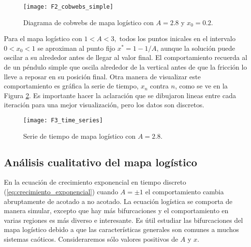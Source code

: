             \begin{figure}[hbtp]
                \caption{Diagrama de cobwebs de mapa logístico con $A = 2.8$ y $x_{0} = 0.2$.}
                \centering
                \texttt{[image: F2\_cobwebs\_simple]}
                \label{fig:F2_cobwebs_simple}
            \end{figure}

            Para el mapa logístico con $1 < A < 3,$ todos los puntos inicales en el intervalo $0 < x_{0} < 1$ se aproximan al punto fijo $x^{*} = 1 - 1/ A $, aunque la solución puede oscilar a su alrededor antes de llegar al valor final. El comportamiento recuerda al de un péndulo simple que oscila alrededor de la vertical antes de que la fricción lo lleve a reposar en su posición final. Otra manera de visualizar este comportamiento es gráfica la serie de tiempo, $x_{n}$ contra $n$, como se ve en la Figura \ref{fig:F3_time_series}. Es importante hacer la aclaración que se dibujaron lineas entre cada iteración para una mejor visualización, pero los datos son discretos. 

            \begin{figure}[hbtp]
                \caption{Serie de tiempo de mapa logístico con $A = 2.8$.}
                \centering
                \texttt{[image: F3\_time\_series]}
                \label{fig:F3_time_series}
            \end{figure}

        \subsection{Análisis cualitativo del mapa logístico }

            En la ecuación de crecimiento exponencial en tiempo discreto (\ref{eq:crecimiento_exponencial}) cuando $A = \pm 1$ el comportamiento cambia abruptamente de acotado a no acotado. La ecuación logística se comporta de manera simular, excepto que hay más bifurcaciones y el comportamiento en varias regiones es más diverso e interesante. Es útil estudiar las bifurcaciones del mapa logístico debido a que las características generales son comunes a muchos sistemas caóticos. Consideraremos sólo valores positivos de $A$ y $x$.

